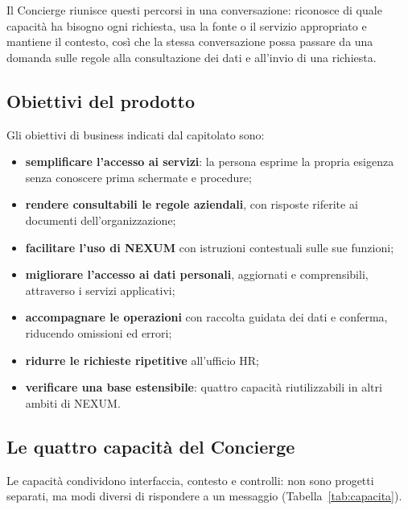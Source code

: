 \documentclass[documento]{gpt}
\begin{document}
Il Concierge riunisce questi percorsi in una conversazione: riconosce di quale
capacità ha bisogno ogni richiesta, usa la fonte o il servizio appropriato e
mantiene il contesto, così che la stessa conversazione possa passare da una
domanda sulle regole alla consultazione dei dati e all'invio di una richiesta.

\subsection{Obiettivi del prodotto}
Gli obiettivi di business indicati dal capitolato sono:
\begin{itemize}
  \item \textbf{semplificare l'accesso ai servizi}: la persona esprime la propria
        esigenza senza conoscere prima schermate e procedure;
  \item \textbf{rendere consultabili le regole aziendali}, con risposte riferite
        ai documenti dell'organizzazione;
  \item \textbf{facilitare l'uso di NEXUM} con istruzioni contestuali sulle sue
        funzioni;
  \item \textbf{migliorare l'accesso ai dati personali}, aggiornati e
        comprensibili, attraverso i servizi applicativi;
  \item \textbf{accompagnare le operazioni} con raccolta guidata dei dati e
        conferma, riducendo omissioni ed errori;
  \item \textbf{ridurre le richieste ripetitive} all'ufficio HR;
  \item \textbf{verificare una base estensibile}: quattro capacità riutilizzabili
        in altri ambiti di NEXUM.
\end{itemize}

\subsection{Le quattro capacità del Concierge}
Le capacità condividono interfaccia, contesto e controlli: non sono progetti
separati, ma modi diversi di rispondere a un messaggio
(Tabella~\ref{tab:capacita}).
\end{document}
